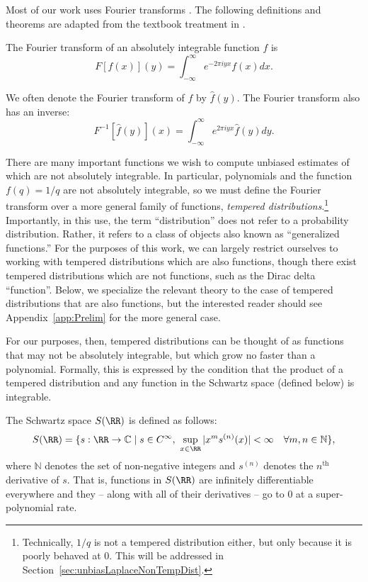 \documentclass[11pt]{article}
\newcommand{\C}{\mathbb{C}}
\newcommand{\N}{\mathbb{N}}
\begin{document}
Most of our work uses Fourier transforms \cite{Fourier_2009}. The following definitions and theorems are adapted from the textbook treatment in \cite{vanDijk+2013}.

\begin{definition} \label{def:FourierAbsInt}
The Fourier transform of an absolutely integrable function $f$ is
    $$F[f(x)](y) = \int_{-\infty}^\infty e^{-2\pi i yx} f(x) dx.$$

We often denote the Fourier transform of $f$ by $\hat f(y)$.
    The Fourier transform also has an inverse:
    $$F^{-1}[\hat{f}(y)](x) = \int_{-\infty}^\infty e^{2\pi i yx} \hat{f}(y) dy.$$
\end{definition}

There are many important functions we wish to compute unbiased estimates of which are not absolutely integrable. In particular, polynomials and the function $f(q) = 1/q$ are not absolutely integrable, so we must define the Fourier transform over a more general family of functions, \textit{tempered distributions}.\footnote{Technically, $1/q$ is not a tempered distribution either, but only because it is poorly behaved at 0. This will be addressed in Section~\ref{sec:unbiasLaplaceNonTempDist}.} Importantly, in this use, the term ``distribution'' does not refer to a probability distribution. Rather, it refers to a class of objects also known as ``generalized functions.'' For the purposes of this work, we can largely restrict ourselves to working with tempered distributions which are also functions, though there exist tempered distributions which are not functions, such as the Dirac delta ``function''. Below, we specialize the relevant theory to the case of tempered distributions that are also functions, but the interested reader should see Appendix~\ref{app:Prelim} for the more general case.

For our purposes, then, tempered distributions can be thought of as functions that may not be absolutely integrable, but which grow no faster than a polynomial. Formally, this is expressed by the condition that the product of a tempered distribution and any function in the Schwartz space (defined below) is integrable.

\begin{definition} \label{def:SchwartzSpace}
    The Schwartz space $S(\RR)$ is defined as follows:
    $$S(\RR) = \{s:\RR \rightarrow \C \mid s \in C^\infty, \,\, \sup_{x \in \RR} |x^m s^{(n)}(x)| < \infty \quad \forall m,n \in \N \},$$
    where $\N$ denotes the set of non-negative integers and $s^{(n)}$ denotes the $n^\text{th}$ derivative of $s$.
    That is, functions in $S(\RR)$ are infinitely differentiable everywhere and they -- along with all of their derivatives -- go to 0 at a super-polynomial rate.
\end{definition}
\end{document}
